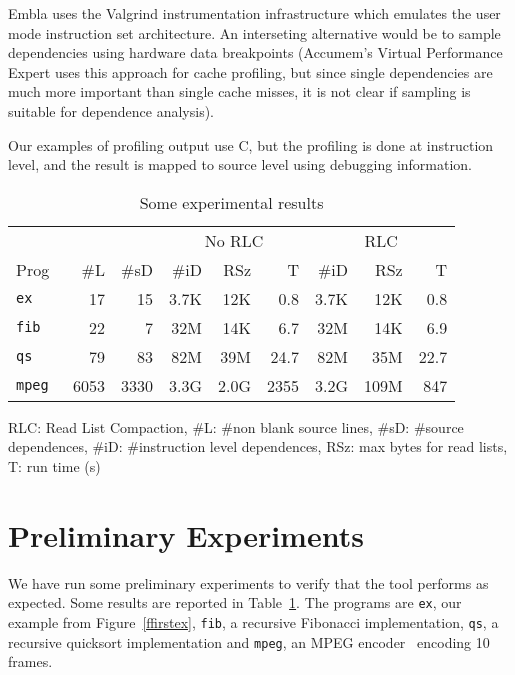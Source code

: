 \documentclass[times, 10pt,twocolumn]{article}
\begin{document}
Embla uses the Valgrind instrumentation infrastructure which emulates
the user mode instruction set architecture. An interseting alternative
would be to sample dependencies using hardware data breakpoints
(Accumem's Virtual Performance Expert uses this approach for cache
profiling, but since single dependencies are much more important than
single cache misses, it is not clear if sampling is suitable for
dependence analysis).

Our examples of profiling
output use C, but
the profiling is done at instruction level, and the result is
mapped to source level using debugging information.





\begin{table} \small
\begin{center} \newcommand{\sms}{\hskip0.4em}
\begin{tabular}{|@{\sms}l@{\sms}|r@{\sms}r|r@{\sms}r@{\sms}r|r@{\sms}r@{\sms}r|} \hline
 & & & \multicolumn{3}{|c|}{No RLC} & 
\multicolumn{3}{c|}{RLC} \\
Prog & \#L & \#sD & \#iD & RSz & T 
                              & \#iD & RSz & T \\ \hline
\tt ex & 17 & 15 & 3.7K & 12K & 0.8 & 3.7K & 12K & 0.8 \\
\tt fib & 22 & 7 & 32M & 14K & 6.7 & 32M & 14K & 6.9 \\
\tt qs & 79 & 83 & 82M & 39M & 24.7 & 82M & 35M & 22.7 \\
\tt mpeg & 6053 & 3330 & 3.3G & 2.0G & 2355 & 3.2G & 109M & 847 \\ \hline
\end{tabular}
\end{center}
RLC: Read List Compaction, 
\#L: \#non blank source lines, \#sD: \#source dependences, \#iD: 
\#instruction
level dependences, RSz: max bytes for read lists, T: run time (s)
\caption{Some experimental results} \label{trex}
\end{table}

\section{Preliminary Experiments}

We have run some preliminary experiments to verify that the tool performs as
expected. Some results are reported in Table~\ref{trex}. The programs are 
{\tt ex}, our example from Figure~\ref{ffirstex}, {\tt fib}, a recursive
Fibonacci implementation, {\tt qs}, a recursive quicksort implementation 
and {\tt mpeg}, an MPEG encoder~\cite{MPEG} encoding 10 frames.
\end{document}
